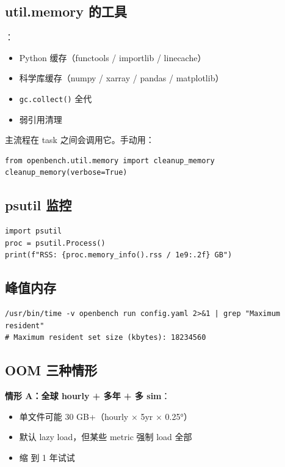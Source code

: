 \subsection{util.memory 的工具}

：

\begin{itemize}
  \item Python 缓存（functools / importlib / linecache）
  \item 科学库缓存（numpy / xarray / pandas / matplotlib）
  \item \texttt{gc.collect()} 全代
  \item 弱引用清理
\end{itemize}

主流程在 task 之间会调用它。手动用：

\begin{verbatim}
from openbench.util.memory import cleanup_memory
cleanup_memory(verbose=True)
\end{verbatim}

\subsection{psutil 监控}

\begin{verbatim}
import psutil
proc = psutil.Process()
print(f"RSS: {proc.memory_info().rss / 1e9:.2f} GB")
\end{verbatim}

\subsection{峰值内存}

\begin{verbatim}
/usr/bin/time -v openbench run config.yaml 2>&1 | grep "Maximum resident"
# Maximum resident set size (kbytes): 18234560
\end{verbatim}

\subsection{OOM 三种情形}

\textbf{情形 A：全球 hourly + 多年 + 多 sim}：
\begin{itemize}
  \item 单文件可能 30 GB+（hourly × 5yr × 0.25°）
  \item \openbench{} 默认 lazy load，但某些 metric 强制 load 全部
  \item 缩  到 1 年试试
\end{itemize}

